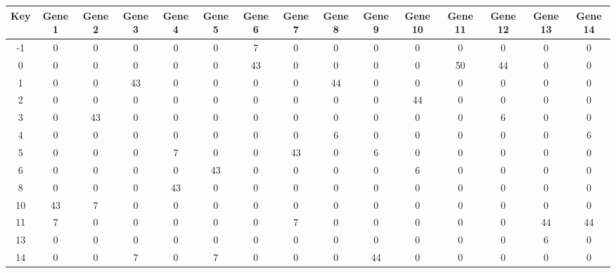 \begin{tabular}{|c|c|c|c|c|c|c|c|c|c|c|c|c|c|c|}
\hline
Key & Gene 1 & Gene 2 & Gene 3 & Gene 4 & Gene 5 & Gene 6 & Gene 7 & Gene 8 & Gene 9 & Gene 10 & Gene 11 & Gene 12 & Gene 13 & Gene 14 \\
\hline
-1 & 0 & 0 & 0 & 0 & 0 & 7 & 0 & 0 & 0 & 0 & 0 & 0 & 0 & 0 \\
0 & 0 & 0 & 0 & 0 & 0 & 43 & 0 & 0 & 0 & 0 & 50 & 44 & 0 & 0 \\
1 & 0 & 0 & 43 & 0 & 0 & 0 & 0 & 44 & 0 & 0 & 0 & 0 & 0 & 0 \\
2 & 0 & 0 & 0 & 0 & 0 & 0 & 0 & 0 & 0 & 44 & 0 & 0 & 0 & 0 \\
3 & 0 & 43 & 0 & 0 & 0 & 0 & 0 & 0 & 0 & 0 & 0 & 6 & 0 & 0 \\
4 & 0 & 0 & 0 & 0 & 0 & 0 & 0 & 6 & 0 & 0 & 0 & 0 & 0 & 6 \\
5 & 0 & 0 & 0 & 7 & 0 & 0 & 43 & 0 & 6 & 0 & 0 & 0 & 0 & 0 \\
6 & 0 & 0 & 0 & 0 & 43 & 0 & 0 & 0 & 0 & 6 & 0 & 0 & 0 & 0 \\
8 & 0 & 0 & 0 & 43 & 0 & 0 & 0 & 0 & 0 & 0 & 0 & 0 & 0 & 0 \\
10 & 43 & 7 & 0 & 0 & 0 & 0 & 0 & 0 & 0 & 0 & 0 & 0 & 0 & 0 \\
11 & 7 & 0 & 0 & 0 & 0 & 0 & 7 & 0 & 0 & 0 & 0 & 0 & 44 & 44 \\
13 & 0 & 0 & 0 & 0 & 0 & 0 & 0 & 0 & 0 & 0 & 0 & 0 & 6 & 0 \\
14 & 0 & 0 & 7 & 0 & 7 & 0 & 0 & 0 & 44 & 0 & 0 & 0 & 0 & 0 \\
\hline
\end{tabular}